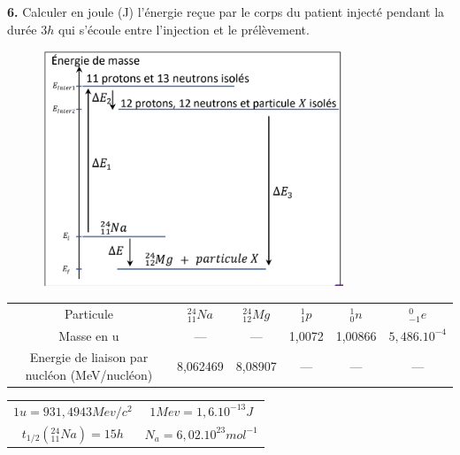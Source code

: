 \documentclass[12pt]{article}
\begin{document}
\textbf{6. } Calculer en joule (J) l’énergie reçue par le corps du patient injecté pendant la durée $3h$ qui s’écoule
entre l’injection et le prélèvement.
\begin{figure}[h]
\begin{center}
\includegraphics[width=9cm]{./diagram.png}
	\end{center}
\end{figure}
\begin{center}
\begin{tabular}{ |c|| c| c| c| c| c| }
	Particule & $_{11}^{24}Na$ & $_{12}^{24}Mg$ &  $_1^1p$ & $^1_0n$ & $^0_{-1}e$ \\ 
	Masse en u & --- & --- & 1,0072 & 1,00866 & $5,486.10^{-4}$ \\  
 Energie de liaison par
	nucléon (MeV/nucléon) & 8,062469 & 8,08907 & --- & --- & --- \\     
\end{tabular}
\end{center}



\begin{center}
\begin{tabular}{ ||c|| c|| }
	$1u = 931,4943 Mev/c^2$ & $1Mev = 1,6.10^{-13}J$ \\ 
	$t_{1/2}(_{11}^{24}Na) = 15h$ & $N_a = 6,02.10^{23} mol^{-1}$ \\  
\end{tabular}
\end{center}
\end{document}
